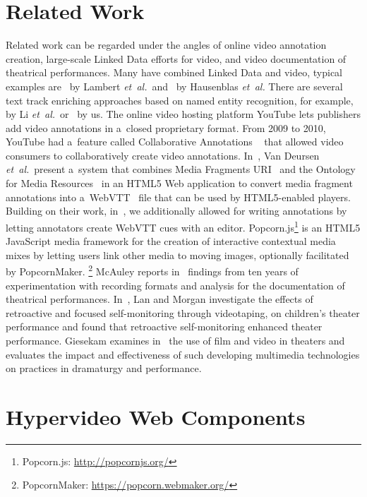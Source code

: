 \documentclass[runningheads,a4paper]{llncs}
\begin{document}
\section{Related Work}

Related work can be regarded under the angles
of online video annotation creation, large-scale Linked Data 
efforts for video, and video documentation of theatrical performances.
Many have combined Linked Data and video,
typical examples are~\cite{lambert2010linkeddata} by Lambert \emph{et~al.}\
and~\cite{hausenblas2009im} by Hausenblas \emph{et~al.}
There are several text track enriching approaches
based on named entity recognition,
for example,~\cite{yi2012synote} by Li \emph{et~al.}\
or~\cite{steiner2010semwebvid} by us.
The online video hosting platform YouTube
lets publishers add video annotations
in a~closed proprietary format.
From 2009 to 2010, YouTube had a~feature called
Collaborative Annotations%
~\cite{fink2009collaborativeannotations}
that allowed video consumers to collaboratively
create video annotations.
In~\cite{vandeursen2012mediafragmentannotations},
Van Deursen \emph{et~al.}\ present a~system
that combines Media Fragments URI~\cite{troncy2012mediafragments}
and the Ontology for Media Resources~\cite{lee2012mediaontology}
in an HTML5 Web application to convert
media fragment annotations into a~WebVTT~\cite{pfeiffer2013webvtt} file
that can be used by HTML5-enabled players.
Building on their work, in~\cite{steiner2014webvtt},
we additionally allowed for writing annotations by
letting annotators create WebVTT cues with an editor.
Popcorn.js\footnote{Popcorn.js: \url{http://popcornjs.org/}}
is an HTML5 JavaScript media framework
for the creation of interactive contextual media mixes
by letting users link other media to moving images,
optionally facilitated by PopcornMaker.
\footnote{PopcornMaker: \url{https://popcorn.webmaker.org/}}
McAuley reports in~\cite{mcauley1994video} findings from ten years of experimentation
with recording formats and analysis for the documentation of theatrical performances.
In~\cite{lan2003video}, Lan and Morgan investigate the effects of retroactive and
focused self-monitoring through videotaping, on children's theater performance
and found that retroactive self-monitoring enhanced theater performance.
Giesekam examines in~\cite{giesekam2007staging} the use of film and video in theaters
and evaluates the impact and effectiveness of such developing multimedia technologies on practices in dramaturgy and performance.

\section{Hypervideo Web Components}
\label{sec:hypervideo-web-components}
\end{document}
